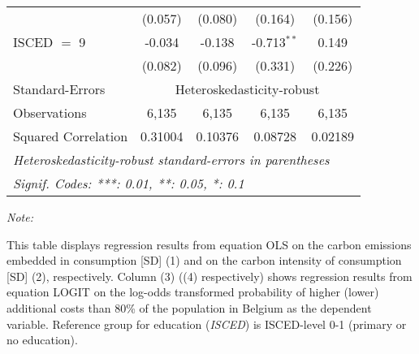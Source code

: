 \begin{table}[htbp!]
\begin{adjustbox}{width = 1\textwidth, max height = 0.95\textheight, center}
\begin{threeparttable}[b]
\begin{tabular}{lcccc}
                                 & (0.057)            & (0.080)            & (0.164)       & (0.156)\\   
            ISCED $=$ 9          & -0.034             & -0.138             & -0.713$^{**}$ & 0.149\\   
                                 & (0.082)            & (0.096)            & (0.331)       & (0.226)\\   
            \midrule 
            Standard-Errors & \multicolumn{4}{c}{Heteroskedasticity-robust} \\ 
            Observations         & 6,135              & 6,135              & 6,135         & 6,135\\  
            Squared Correlation  & 0.31004            & 0.10376            & 0.08728       & 0.02189\\  
            \midrule \midrule
            \multicolumn{5}{l}{\emph{Heteroskedasticity-robust standard-errors in parentheses}}\\
            \multicolumn{5}{l}{\emph{Signif. Codes: ***: 0.01, **: 0.05, *: 0.1}}\\
         \end{tabular}
         
         \begin{tablenotes}\item \medskip \textit{Note:}
            \item This table displays regression results from equation OLS on the carbon emissions embedded in consumption [SD] (1) and on the carbon intensity of consumption [SD] (2), respectively. 
                                      Column (3) ((4) respectively) shows regression results from equation LOGIT on the log-odds transformed probability of higher (lower) additional costs than 80\% of the population in Belgium as the dependent variable. Reference group for education (\textit{ISCED}) is ISCED-level 0-1 (primary or no education).
         \end{tablenotes}
      \end{threeparttable}
   \end{adjustbox}
\end{table}


